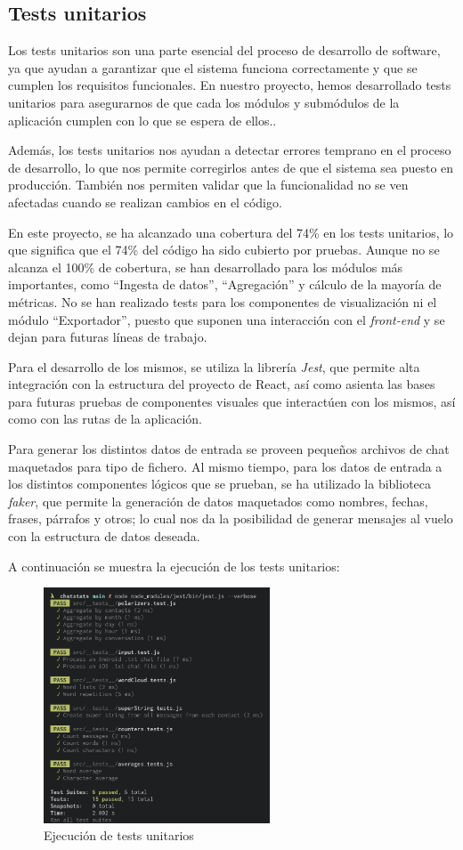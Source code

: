 \subsection{Tests unitarios}

Los tests unitarios son una parte esencial del proceso de desarrollo de software, ya que ayudan a garantizar que el sistema funciona correctamente y que se cumplen los requisitos funcionales. En nuestro proyecto, hemos desarrollado tests unitarios para asegurarnos de que cada los módulos y submódulos de la aplicación cumplen con lo que se espera de ellos..

Además, los tests unitarios nos ayudan a detectar errores temprano en el proceso de desarrollo, lo que nos permite corregirlos antes de que el sistema sea puesto en producción. También nos permiten validar que la funcionalidad no se ven afectadas cuando se realizan cambios en el código.

En este proyecto, se ha alcanzado una cobertura del 74\% en los tests unitarios, lo que significa que el 74\% del código ha sido cubierto por pruebas. Aunque no se alcanza el 100\% de cobertura, se han desarrollado para los módulos más importantes, como ``Ingesta de datos'', ``Agregación'' y cálculo de la mayoría de métricas. No se han realizado tests para los componentes de visualización ni el módulo ``Exportador'', puesto que suponen una interacción con el \textit{front-end} y se dejan para futuras líneas de trabajo.

Para el desarrollo de los mismos, se utiliza la librería \textit{Jest}, que permite alta integración con la estructura del proyecto de React, así como asienta las bases para futuras pruebas de componentes visuales que interactúen con los mismos, así como con las rutas de la aplicación.

Para generar los distintos datos de entrada se proveen pequeños archivos de chat maquetados para tipo de fichero. Al mismo tiempo, para los datos de entrada a los distintos componentes lógicos que se prueban, se ha utilizado la biblioteca \textit{faker}, que permite la generación de datos maquetados como nombres, fechas, frases, párrafos y otros; lo cual nos da la posibilidad de generar mensajes al vuelo con la estructura de datos deseada.

A continuación se muestra la ejecución de los tests unitarios:

\begin{figure}[H]
	\centering
	\includegraphics[width=0.6\textwidth]{img/tests.png}
	\caption{Ejecución de tests unitarios}
	\label{fig:chap4:architecture_tests}
\end{figure}